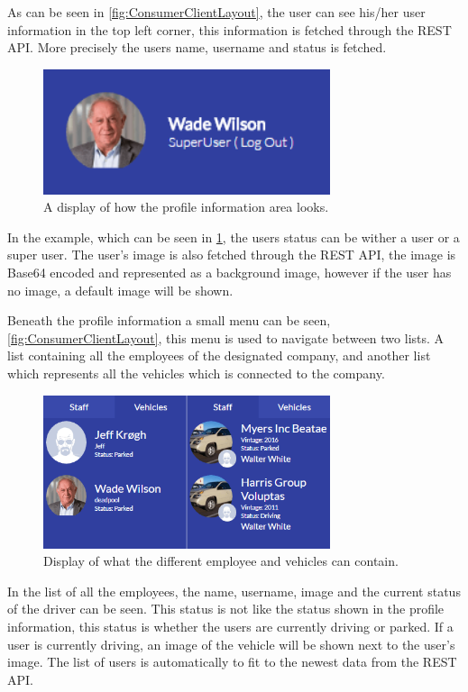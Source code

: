 As can be seen in \cref{fig:ConsumerClientLayout}, the user can see his/her user information in the top left corner, this information is fetched through the REST API.
More precisely the users name, username and status is fetched.
\begin{figure}[h]
    \centering
    \includegraphics[width=0.75\textwidth]{img/ConsumerClientProfile.png}
    \caption{A display of how the profile information area looks.}
    \label{fig:ConsumerClientProfile}
\end{figure}
In the example, which can be seen in \cref{fig:ConsumerClientProfile}, the users status can be wither a user or a super user.
The user's image is also fetched through the REST API, the image is Base64 encoded and represented as a background image, however if the user has no image, a default image will be shown.

\bigskip
Beneath the profile information a small menu can be seen, \cref{fig:ConsumerClientLayout}, this menu is used to navigate between two lists.
A list containing all the employees of the designated company, and another list which represents all the vehicles which is connected to the company.

\begin{figure}[h]
    \centering
    \includegraphics[width=0.75\textwidth]{img/displayOfMenuesInConsumerClient.png}
    \caption{Display of what the different employee and vehicles can contain.}
    \label{fig:ConsumerClientMenus}
\end{figure}

In the list of all the employees, the name, username, image and the current status of the driver can be seen.
This status is not like the status shown in the profile information, this status is whether the users are currently driving or parked.
If a user is currently driving, an image of the vehicle will be shown next to the user's image.
The list of users is automatically to fit to the newest data from the REST API.

